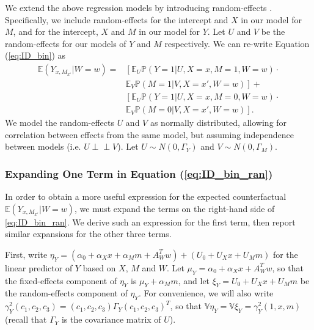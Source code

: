 \documentclass{article}
\newcommand{\bP}{\mathbb{P}}
\newcommand{\bE}{\mathbb{E}}
\newcommand{\bV}{\mathbb{V}}
\newcommand{\indep}{\perp \!\!\! \perp}
\begin{document}
We extend the above regression models by introducing random-effects \citep[see, e.g.][]{Dem04}. Specifically, we include random-effects for the intercept and $X$ in our model for $M$, and for the intercept, $X$ and $M$ in our model for $Y$. Let $U$ and $V$ be the random-effects for our models of $Y$ and $M$ respectively. We can re-write Equation (\ref{eq:ID_bin}) as
%
\begin{align}
    \bE (Y_{x, M_{x'}} | W=w) = & \left[\bE_U \bP \left( Y=1 |U, X=x, M=1, W=w \right) \right. \cdot \label{eq:ID_bin_ran}\\
    &  \left. \bE_V \bP(M=1 |V, X = x', W=w)\right] + \nonumber \\ 
    & \left[ \bE_U \bP \left( Y=1 |U, X=x, M=0, W=w \right) \right. \cdot \nonumber \\
    & \left. \bE_V \bP(M=0 |V, X = x', W=w) \right]. \nonumber 
\end{align}
%
We model the random-effects $U$ and $V$ as normally distributed, allowing for correlation between effects from the same model, but assuming independence between models (i.e. $U \indep V$). Let $U \sim N(0, \Gamma_Y)$ and $V \sim N(0, \Gamma_M)$.


\subsubsection{Expanding One Term in Equation (\ref{eq:ID_bin_ran})}

In order to obtain a more useful expression for the expected counterfactual $\bE (Y_{x, M_{x'}} | W=w)$, we must expand the terms on the right-hand side of \eqref{eq:ID_bin_ran}. We derive such an expression for the first term, then report similar expansions for the other three terms. 

First, write $\eta_Y = (\alpha_0 + \alpha_X x + \alpha_M m + A_W^T w) + (U_0 + U_X x + U_M m)$ for the linear predictor of $Y$ based on $X$, $M$ and $W$. Let $\mu_Y = \alpha_0 + \alpha_X x + A_W^T w$, so that the fixed-effects component of $\eta_Y$ is $\mu_Y + \alpha_M m$, and let $\xi_Y = U_0 + U_X x + U_M m$ be the random-effects component of $\eta_Y$. For convenience, we will also write $\gamma^2_Y(c_1, c_2, c_3) = (c_1, c_2, c_3) \Gamma_Y (c_1, c_2, c_3)^T$, so that $\bV \eta_Y = \bV \xi_Y = \gamma^2_Y(1, x, m)$ (recall that $\Gamma_Y$ is the covariance matrix of $U$).
\end{document}

